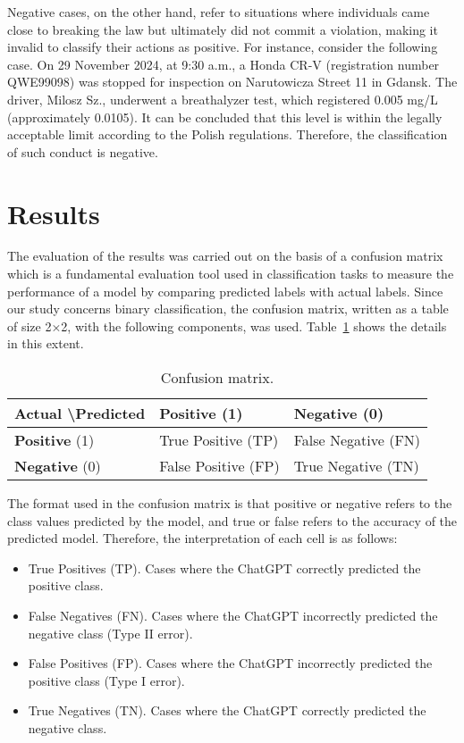 \documentclass[preprint,12pt,number]{elsarticle}
\begin{document}
Negative cases, on the other hand, refer to situations where individuals came close to breaking the law but ultimately did not commit a violation, making it invalid to classify their actions as positive. For instance, consider the following case. 
On 29 November 2024, at 9:30 a.m., a Honda CR-V (registration number QWE99098) was stopped for inspection on Narutowicza Street 11 in Gdansk. The driver, Milosz Sz., underwent a breathalyzer test, which registered 0.005 mg/L (approximately 0.0105\textperthousand). It can be concluded that this level is within the legally acceptable limit according to the Polish regulations. Therefore, the classification of such conduct is negative.

\section{Results}
\label{sec:Results}
The evaluation of the results was carried out on the basis of a confusion matrix which is a fundamental evaluation tool used in classification tasks to measure the performance of a model by comparing predicted labels with actual labels. 
Since our study concerns binary classification, the confusion matrix, written as a table of size 2×2, with the following components, was used. Table~\ref{tab:confusion-matrix} shows the details in this extent. 

\begin{table}[h]
\caption{Confusion matrix.}
\label{tab:confusion-matrix}
\centering
\begin{tabular}{|l|l|l|}
\hline
\textbf{Actual }\textbackslash \textbf{Predicted} & \textbf{Positive} (1) & \textbf{Negative} (0) \\ \hline
\textbf{Positive}   (1)  & True   Positive (TP)  & False   Negative (FN) \\ \hline
\textbf{Negative }  (0)  & False   Positive (FP) & True   Negative (TN)  \\ \hline
\end{tabular}
\end{table}

The format used in the confusion matrix is that positive or negative refers to the class values predicted by the model, and true or false refers to the accuracy of the predicted model. Therefore, the interpretation of each cell is as follows: 

\begin{itemize}
    \item True Positives (TP). Cases where the ChatGPT correctly predicted the positive class.
    \item False Negatives (FN). Cases where the ChatGPT incorrectly predicted the negative class (Type II error).
    \item False Positives (FP). Cases where the ChatGPT incorrectly predicted the positive class (Type I error).
    \item True Negatives (TN). Cases where the ChatGPT correctly predicted the negative class.
\end{itemize}
\end{document}
